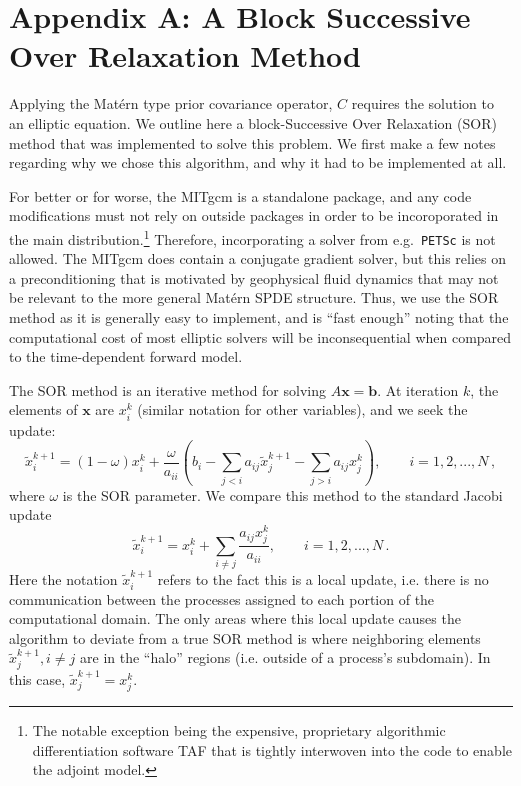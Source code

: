 \section{Appendix A: A Block Successive Over Relaxation Method}
\label{sec:block_sor}

Applying the Mat\'ern type prior covariance operator, $C$
requires the solution to an elliptic equation.
We outline here a block-Successive Over Relaxation (SOR) method that was
implemented to solve this problem.
We first make a few notes regarding why we chose this algorithm, and why it had
to be implemented at all.

For better or for worse, the MITgcm is a standalone package, and any code
modifications must not rely on outside packages in order to be incoroporated in
the main distribution.\footnote{The notable exception being the expensive,
    proprietary algorithmic differentiation software TAF \citep{giering2005}
    that is tightly interwoven into the code to enable the adjoint model.}
Therefore, incorporating a solver from e.g.\ \texttt{PETSc} is not allowed.
The MITgcm does contain a conjugate gradient solver, but this relies on
a preconditioning that is motivated by geophysical fluid dynamics that may not
be relevant to the more general Mat\'ern SPDE structure.
Thus, we use the SOR method as it is generally easy to implement, and is ``fast
enough'' noting that the computational cost of most elliptic solvers will be
inconsequential when compared to the time-dependent forward model.

The SOR method is an iterative method for solving $A\mathbf{x} = \mathbf{b}$.
At iteration $k$, the elements of $\mathbf{x}$ are $x_i^k$ (similar
notation for other variables), and we seek the update:
\begin{equation}
    \tilde{x}_i^{k+1} = (1-\omega) x_i^k + \dfrac{\omega}{a_{ii}}
    \left( b_i - \sum_{j<i}a_{ij}\tilde{x}_j^{k+1} -
        \sum_{j>i}a_{ij}x_j^{k}\right), \qquad
        i=1,2,...,N \, ,
    \label{eq:sor_update}
\end{equation}
where $\omega$ is the SOR parameter.
We compare this method to the standard Jacobi update
$$\tilde{x}_i^{k+1} = x_i^k + \sum_{i\ne j}\dfrac{a_{ij}x_j^k}{a_{ii}}, \qquad
i=1,2,...,N \, .$$
Here the notation $\tilde{x}_i^{k+1}$ refers to the fact this is a local update,
i.e. there is no communication between the processes assigned to each portion of
the computational domain.
The only areas where this local update causes the algorithm to deviate from a
true SOR method is where neighboring elements
$\tilde{x}^{k+1}_{j}, i\ne j$ are in the ``halo'' regions (i.e. outside of a
process's subdomain).
In this case, $\tilde{x}^{k+1}_j = x^k_j$.

